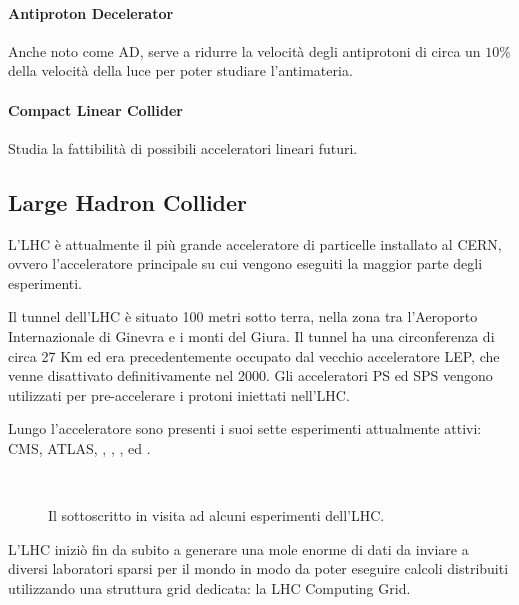 		\paragraph{Antiproton Decelerator}Anche noto come \acs{AD}, serve a ridurre la velocità degli antiprotoni di circa un $10\%$ della velocità della luce per poter studiare l'antimateria.
		
		\paragraph{Compact Linear Collider}Studia la fattibilità di possibili acceleratori lineari futuri.
		
		\subsection{Large Hadron Collider} \label{subsec:C;a;LHC}
			
			L'\ac{LHC} è attualmente il più grande acceleratore di particelle installato al \ac{CERN}, ovvero l'acceleratore principale su cui vengono eseguiti la maggior parte degli esperimenti.
			
			Il tunnel dell'\ac{LHC} è situato 100 metri sotto terra, nella zona tra l'Aeroporto Internazionale di Ginevra e i monti del Giura. Il tunnel ha una circonferenza di circa 27 Km ed era precedentemente occupato dal vecchio acceleratore \ac{LEP}, che venne disattivato definitivamente nel 2000. Gli acceleratori \ac{PS} ed \ac{SPS} vengono utilizzati per pre-accelerare i protoni iniettati nell'\ac{LHC}.
			
			Lungo l'acceleratore sono presenti i suoi sette esperimenti attualmente attivi: \ac{CMS}, \ac{ATLAS}, , , ,  ed .
			
			\begin{figure}[h!]
				\begin{center}
					~
				\end{center}
				\caption[Visita all'LHC]{Il sottoscritto in visita ad alcuni esperimenti dell'LHC.}
				\label{fig:visita_lhc}
			\end{figure}
			
			L'\ac{LHC} iniziò fin da subito a generare una mole enorme di dati da inviare a diversi laboratori sparsi per il mondo in modo da poter eseguire calcoli distribuiti utilizzando una struttura grid dedicata: la LHC Computing Grid.
			
